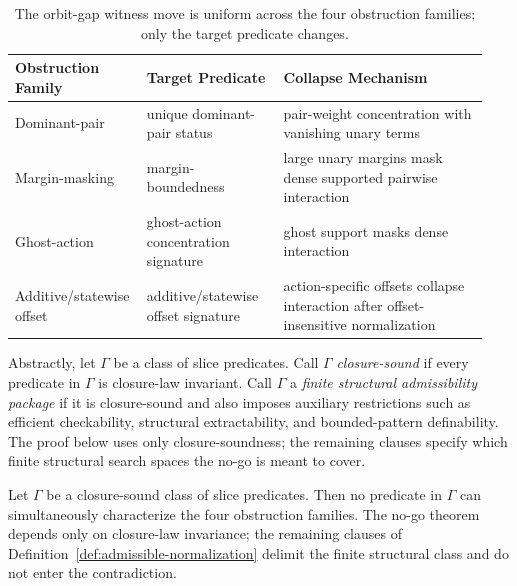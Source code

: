 \begin{table}[h]
\centering
\small
\setlength{\tabcolsep}{4pt}
\renewcommand{\arraystretch}{1.12}
\renewcommand{\tabularxcolumn}[1]{m{#1}}
\begin{tabularx}{\linewidth}{@{}>{\raggedright\arraybackslash}m{0.23\linewidth}>{\raggedright\arraybackslash}m{0.29\linewidth}>{\raggedright\arraybackslash}m{0.42\linewidth}@{}}
\toprule
\textbf{Obstruction Family} & \textbf{Target Predicate} & \textbf{Collapse Mechanism} \\
\midrule
Dominant-pair & unique dominant-pair status & pair-weight concentration with vanishing unary terms \\
\midrule
Margin-masking & margin-boundedness & large unary margins mask dense supported pairwise interaction \\
\midrule
Ghost-action & ghost-action concentration signature & ghost support masks dense interaction \\
\midrule
Additive/statewise offset & additive/statewise offset signature & action-specific offsets collapse interaction after offset-insensitive normalization \\
\bottomrule
\end{tabularx}
\caption{The orbit-gap witness move is uniform across the four obstruction families; only the target predicate changes.}
\label{tab:obstruction-families-summary}
\end{table}

Abstractly, let $\Gamma$ be a class of slice predicates. Call $\Gamma$ \emph{closure-sound} if every predicate in $\Gamma$ is closure-law invariant. Call $\Gamma$ a \emph{finite structural admissibility package} if it is closure-sound and also imposes auxiliary restrictions such as efficient checkability, structural extractability, and bounded-pattern definability. The proof below uses only closure-soundness; the remaining clauses specify which finite structural search spaces the no-go is meant to cover.

\begin{theorem}\label{thm:closure-sound-package-no-go}
Let $\Gamma$ be a closure-sound class of slice predicates. Then no predicate in $\Gamma$ can simultaneously characterize the four obstruction families. The no-go theorem depends only on closure-law invariance; the remaining clauses of Definition~\ref{def:admissible-normalization} delimit the finite structural class and do not enter the contradiction.
\end{theorem}

